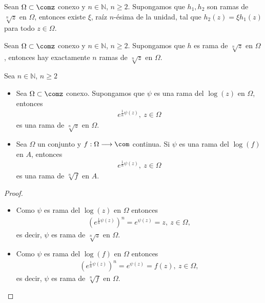 \begin{prop}
Sean $\Omega \subset \comz$ conexo y $n \in \mathbb{N}$, $n \ge 2$. Supongamos que $h_1,h_2$ son ramas de $\sqrt[n]{z}$ en $\Omega$, entonces existe $\xi$, raíz $n$-ésima de la unidad, tal que $h_2(z) = \xi h_1(z)$ para todo $z \in \Omega$.
\end{prop}

\begin{prop}
Sean $\Omega \subset \comz$ conexo y $n \in \mathbb{N}$, $n \ge 2$. Supongamos que $h$ es rama de $\sqrt[n]{z}$ en $\Omega$, entonces hay exactamente $n$ ramas de $\sqrt[n]{z}$ en $\Omega$.
\end{prop}

\begin{prop}
Sea $n \in \mathbb{N}$, $n \ge 2$
\begin{itemize}
    \item Sea $\Omega \subset \comz$ conexo. Supongamos que $\psi$ es una rama del $\log(z)$ en $\Omega$, entonces 
    \begin{align*}
        e^{\frac{1}{n}\psi(z)}, \ z \in \Omega
    \end{align*}
    es una rama de $\sqrt[n]{z}$ en $\Omega$.
    \item Sea $\Omega$ un conjunto y $f : \Omega \longrightarrow \com$ continua. Si $\psi$ es una rama del $\log(f)$ en $A$, entonces
    \begin{align*}
        e^{\frac{1}{n}\psi(z)}, \ z \in \Omega
    \end{align*}
    es una rama de $\sqrt[n]{f}$ en $A$.
\end{itemize}
\end{prop}

\begin{proof}
\begin{itemize}
    \item Como $\psi$ es rama del $\log(z)$ en $\Omega$ entonces
    \begin{align*}
        \left(e^{\frac{1}{n}\psi(z)} \right)^n = e^{\psi(z)} = z, \ z \in \Omega,
    \end{align*}
    es decir, $\psi$ es rama de $\sqrt[n]{z}$ en $\Omega$.
    \item Como $\psi$ es rama del $\log(f)$ en $\Omega$ entonces
    \begin{align*}
        \left(e^{\frac{1}{n}\psi(z)} \right)^n = e^{\psi(z)} = f(z), \ z \in \Omega,
    \end{align*}
    es decir, $\psi$ es rama de $\sqrt[n]{f}$ en $\Omega$. 
\end{itemize}
\end{proof}

